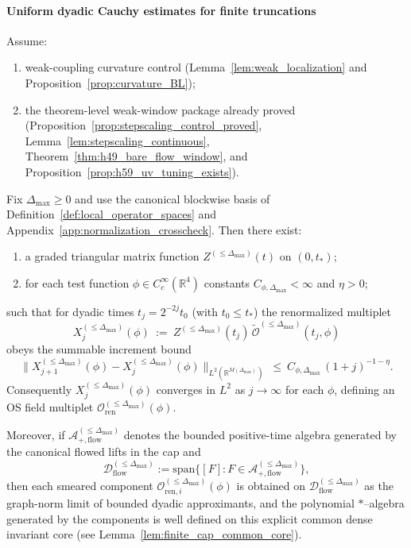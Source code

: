 \paragraph*{Uniform dyadic Cauchy estimates for finite truncations}

\begin{theorem}
\label{thm:field_algebra_truncation}
Assume:
\begin{enumerate}[leftmargin=*]
\item weak-coupling curvature control (Lemma~\ref{lem:weak_localization} and Proposition~\ref{prop:curvature_BL});
\item the theorem-level weak-window package already proved (Proposition~\ref{prop:stepscaling_control_proved}, Lemma~\ref{lem:stepscaling_continuous}, Theorem~\ref{thm:h49_bare_flow_window}, and Proposition~\ref{prop:h59_uv_tuning_exists}).
\end{enumerate}
Fix $\Delta_{\max}\ge 0$ and use the canonical blockwise basis of Definition~\ref{def:local_operator_spaces} and Appendix~\ref{app:normalization_crosscheck}.
Then there exist:
\begin{enumerate}[leftmargin=*]
\item a graded triangular matrix function $Z^{(\le \Delta_{\max})}(t)$ on $(0,t_*)$;
\item for each test function $\phi\in C_c^{\infty}(\mathbb R^4)$ constants $C_{\phi,\Delta_{\max}}<\infty$ and $\eta>0$;
\end{enumerate}
such that for dyadic times $t_j=2^{-2j}t_0$ (with $t_0\le t_*$) the renormalized multiplet
\[
X^{(\le \Delta_{\max})}_j(\phi)
\ :=\ Z^{(\le \Delta_{\max})}(t_j)\,\widetilde{\mathbf{\mathcal O}}^{(\le \Delta_{\max})}(t_j,\phi)
\]
obeys the summable increment bound
\[
\|X^{(\le \Delta_{\max})}_{j+1}(\phi)-X^{(\le \Delta_{\max})}_j(\phi)\|_{L^2(\mathbb R^{M(\Delta_{\max})})}
\ \le\ C_{\phi,\Delta_{\max}}\,(1+j)^{-1-\eta}.
\]
Consequently $X^{(\le \Delta_{\max})}_j(\phi)$ converges in $L^2$ as $j\to\infty$ for each $\phi$, defining an
OS field multiplet $\mathbf{\mathcal O}^{(\le \Delta_{\max})}_{\mathrm{ren}}(\phi)$.

Moreover, if $\mathcal A^{(\le \Delta_{\max})}_{+,\mathrm{flow}}$ denotes the bounded positive-time algebra generated by the
canonical flowed lifts in the cap and
\[
\mathcal D^{(\le \Delta_{\max})}_{\mathrm{flow}}
:=\mathrm{span}\{[F]:F\in \mathcal A^{(\le \Delta_{\max})}_{+,\mathrm{flow}}\},
\]
then each smeared component $\mathcal O^{(\le \Delta_{\max})}_{\mathrm{ren},i}(\phi)$ is obtained on
$\mathcal D^{(\le \Delta_{\max})}_{\mathrm{flow}}$ as the graph-norm limit of bounded dyadic approximants, and the
polynomial $*$--algebra generated by the components is well defined on this explicit common dense invariant core
(see Lemma~\ref{lem:finite_cap_common_core}).
\end{theorem}

